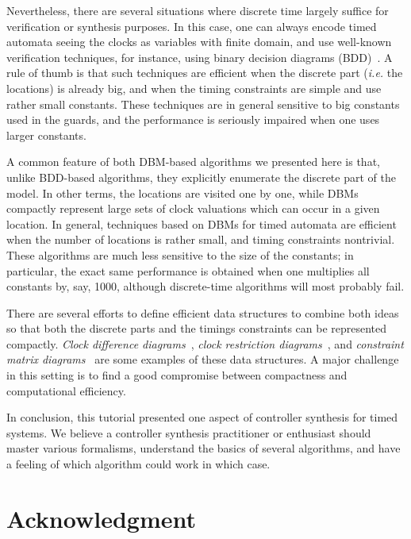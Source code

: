 \documentclass{article}
\begin{document}
Nevertheless, there are several situations where discrete time largely suffice for
verification or synthesis purposes. In this case, one can always encode timed
automata seeing the clocks as variables with finite domain, and use well-known
verification techniques, for instance, using binary decision
diagrams (BDD)~\cite{bozga1999efficient,beyer2001efficient}.
A rule of thumb is that such techniques are efficient when the discrete part
(\textit{i.e.} the locations) is already big, and when the timing constraints
are simple and use rather small constants. These techniques are in general
sensitive to big constants used in the guards, and the performance is seriously impaired
when one uses larger constants.

A common feature of both DBM-based algorithms we presented here is that, unlike
BDD-based algorithms, they
explicitly enumerate the discrete part of the model. In other terms, the
locations are visited one by one, while DBMs compactly represent large sets of clock 
valuations which can occur in a given location. In general, techniques based on
DBMs for timed automata are efficient when the number of locations is rather
small, and timing constraints nontrivial. These algorithms are much less
sensitive to the size of the constants; in particular, the exact same
performance is obtained when one multiplies all constants by, say, 1000,
although discrete-time algorithms will most probably fail.

There are several efforts to define efficient data structures to combine both
ideas so that both the discrete parts and the timings constraints can be
represented compactly. \emph{Clock difference
diagrams}~\cite{behrmann1999efficient}, \emph{clock restriction
diagrams}~\cite{wang2002symbolic}, and \emph{constraint matrix
diagrams}~\cite{ehlers2010fully} are some examples of these data structures. A major
challenge in this setting is to find a good compromise between compactness
and computational efficiency.

In conclusion, this tutorial presented one aspect of controller synthesis for
timed systems. We believe a controller synthesis practitioner or enthusiast
should master various formalisms, understand the basics of several
algorithms, and have a feeling of which algorithm could work in which case.

\section*{Acknowledgment}
\end{document}
